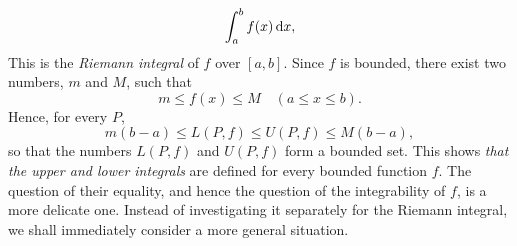 \begin{myDef}
\begin{equation}
        \label{eq:6.4}
        \int_{a}^{b} f(x) \d x,
    \end{equation}
    This is the \emph{Riemann integral} of $f$ over $[a, b]$. 
    Since $f$ is bounded, there exist two numbers, $m$ and $M$, such that
    \begin{equation*}
        m \leq f(x) \leq M \quad 
        (a \leq x \leq b).
    \end{equation*}
    Hence, for every $P$,
    \begin{equation*}
        m(b - a) \leq L(P,f) \leq U(P,f) \leq M(b - a),
    \end{equation*}
    so that the numbers $L(P,f)$ and $U(P,f)$ form a bounded set. 
    This shows \emph{that the upper and lower integrals} are defined for every bounded function $f$.
    The question of their equality, 
    and hence the question of the integrability of $f$, is a more delicate one. 
    Instead of investigating it separately for the Riemann integral,
    we shall immediately consider a more general situation.
\end{myDef}

